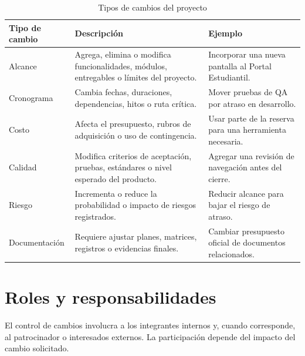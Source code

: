 \documentclass[11pt,spanish]{article}
\begin{document}
\begin{table}[H]
\centering
\caption{Tipos de cambios del proyecto}
\label{tab:tipos-cambios}
{\small
\begin{tabularx}{\textwidth}{p{3.5cm} Y p{3.2cm}}
\toprule
\textbf{Tipo de cambio} & \textbf{Descripción} & \textbf{Ejemplo} \\
\midrule
Alcance & Agrega, elimina o modifica funcionalidades, módulos, entregables o límites del proyecto. & Incorporar una nueva pantalla al Portal Estudiantil. \\
Cronograma & Cambia fechas, duraciones, dependencias, hitos o ruta crítica. & Mover pruebas de QA por atraso en desarrollo. \\
Costo & Afecta el presupuesto, rubros de adquisición o uso de contingencia. & Usar parte de la reserva para una herramienta necesaria. \\
Calidad & Modifica criterios de aceptación, pruebas, estándares o nivel esperado del producto. & Agregar una revisión de navegación antes del cierre. \\
Riesgo & Incrementa o reduce la probabilidad o impacto de riesgos registrados. & Reducir alcance para bajar el riesgo de atraso. \\
Documentación & Requiere ajustar planes, matrices, registros o evidencias finales. & Cambiar presupuesto oficial de documentos relacionados. \\
\bottomrule
\end{tabularx}
}
\end{table}

\section{Roles y responsabilidades}

El control de cambios involucra a los integrantes internos y, cuando corresponde, al patrocinador o interesados externos. La participación depende del impacto del cambio solicitado.
\end{document}

